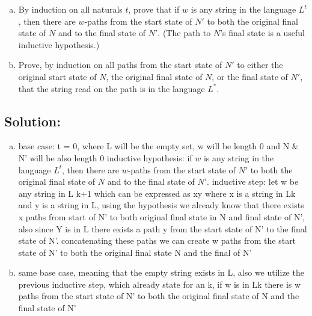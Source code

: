 \documentclass[12pt]{article}
\begin{document}
\begin{enumerate}[(a)]
    \item By induction on all naturals $t$, prove that if $w$ is any string in the language $L^t$, then there are $w$-paths from the start state of $N'$ to both the original final state of $N$ and to the final state of $N'$. (The path to $N$’s final state is a useful inductive hypothesis.)

    \item Prove, by induction on all paths from the start state of $N'$ to either the original start state of $N$, the original final state of $N$, or the final state of $N'$, that the string read on the path is in the language $L^*$.

\end{enumerate}

\subsection*{\textbf{Solution:}}
\begin{enumerate}[(a)]
    \item base case: t = 0, where L will be the empty set, w will be length 0 and N $\&$ N' will be also length 0\newline
    inductive hypothesis: if $w$ is any string in the language $L^t$, then there are $w$-paths from the start state of $N'$ to both the original final state of $N$ and to the final state of $N'$. \newline
    inductive step: let w be any string in L k+1 which can be expressed as xy where x is a string in Lk and y is a string in L, using the hypothesis we already know that there exists x paths from start of N' to both original final state in N and final state of N', also since Y is in L there exists a path y from the start state of N' to the final state of N'. concatenating these paths we can create w paths from the start state of N' to both the original final state N and the final of N'

    \item same base case, meaning that the empty string exists in L, also we utilize the previous inductive step, which already state for an k, if w is in Lk there is w paths from the start state of N' to both the original final state of N and the final state of N'
\end{enumerate}


\newpage
\end{document}
